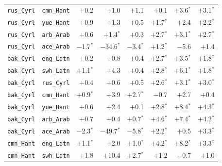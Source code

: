\begin{longtable}{@{}ll rrr rrr@{}}
\texttt{rus\_Cyrl} & \texttt{cmn\_Hant} & $+$0.2\phantom{$^{*}$} & $+$1.0\phantom{$^{*}$} & $+$1.1\phantom{$^{*}$} & $+$0.1\phantom{$^{*}$} & $+$3.6$^{*}$ & $+$3.1$^{*}$ \\
\texttt{rus\_Cyrl} & \texttt{yue\_Hant} & $+$0.9\phantom{$^{*}$} & $+$1.3\phantom{$^{*}$} & $+$0.5\phantom{$^{*}$} & $+$1.7$^{*}$ & $+$2.4\phantom{$^{*}$} & $+$2.2$^{*}$ \\
\texttt{rus\_Cyrl} & \texttt{arb\_Arab} & $+$0.6\phantom{$^{*}$} & $+$1.4$^{*}$ & $+$0.3\phantom{$^{*}$} & $+$2.7$^{*}$ & $+$3.1$^{*}$ & $+$2.7$^{*}$ \\
\texttt{rus\_Cyrl} & \texttt{ace\_Arab} & $-$1.7$^{*}$ & $-$34.6$^{*}$ & $-$3.4$^{*}$ & $+$1.2$^{*}$ & $-$5.6\phantom{$^{*}$} & $+$1.4\phantom{$^{*}$} \\
\addlinespace
\texttt{bak\_Cyrl} & \texttt{eng\_Latn} & $+$0.2\phantom{$^{*}$} & $+$0.8\phantom{$^{*}$} & $+$0.4\phantom{$^{*}$} & $+$2.7$^{*}$ & $+$3.5$^{*}$ & $+$1.8$^{*}$ \\
\texttt{bak\_Cyrl} & \texttt{swh\_Latn} & $+$1.1$^{*}$ & $+$4.3\phantom{$^{*}$} & $+$0.4\phantom{$^{*}$} & $+$2.8$^{*}$ & $+$6.1$^{*}$ & $+$1.8$^{*}$ \\
\texttt{bak\_Cyrl} & \texttt{rus\_Cyrl} & $+$0.4\phantom{$^{*}$} & $+$0.6\phantom{$^{*}$} & $+$0.5\phantom{$^{*}$} & $+$2.6$^{*}$ & $+$3.1$^{*}$ & $+$3.0$^{*}$ \\
\texttt{bak\_Cyrl} & \texttt{cmn\_Hant} & $+$0.9$^{*}$ & $+$3.9\phantom{$^{*}$} & $+$2.7$^{*}$ & $-$0.7\phantom{$^{*}$} & $+$2.7\phantom{$^{*}$} & $+$0.4\phantom{$^{*}$} \\
\texttt{bak\_Cyrl} & \texttt{yue\_Hant} & $+$0.6\phantom{$^{*}$} & $+$2.4\phantom{$^{*}$} & $+$0.1\phantom{$^{*}$} & $+$2.8$^{*}$ & $+$8.4$^{*}$ & $+$4.3$^{*}$ \\
\texttt{bak\_Cyrl} & \texttt{arb\_Arab} & $+$0.7\phantom{$^{*}$} & $+$0.4\phantom{$^{*}$} & $+$0.7$^{*}$ & $+$4.6$^{*}$ & $+$7.4$^{*}$ & $+$4.2$^{*}$ \\
\texttt{bak\_Cyrl} & \texttt{ace\_Arab} & $-$2.3$^{*}$ & $-$49.7$^{*}$ & $-$5.8$^{*}$ & $+$2.2$^{*}$ & $+$0.5\phantom{$^{*}$} & $+$3.3$^{*}$ \\
\addlinespace
\texttt{cmn\_Hant} & \texttt{eng\_Latn} & $+$1.1$^{*}$ & $+$2.0\phantom{$^{*}$} & $+$1.0$^{*}$ & $+$4.2$^{*}$ & $+$8.2$^{*}$ & $+$3.3$^{*}$ \\
\texttt{cmn\_Hant} & \texttt{swh\_Latn} & $+$1.8\phantom{$^{*}$} & $+$10.4\phantom{$^{*}$} & $+$2.7$^{*}$ & $+$1.2\phantom{$^{*}$} & $-$0.7\phantom{$^{*}$} & $+$1.0\phantom{$^{*}$} \\

\end{longtable}
